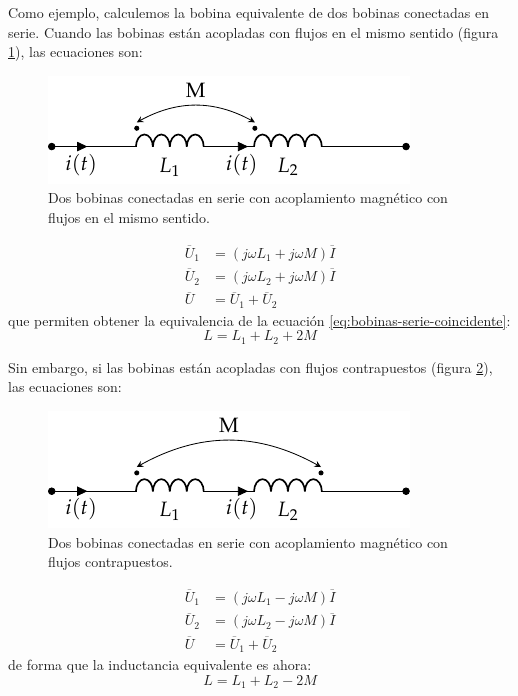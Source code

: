 Como ejemplo, calculemos la bobina equivalente de dos bobinas conectadas en serie. Cuando las bobinas están acopladas con flujos en el mismo sentido (figura \ref{fig:bobinas-serie-mismo-sentido}), las ecuaciones son:

\begin{figure}
  \centering
  \includegraphics[height=0.1\textheight]{../figs/bobinas_serie.pdf}
  \caption{Dos bobinas conectadas en serie con acoplamiento magnético con flujos en el mismo sentido.}
  \label{fig:bobinas-serie-mismo-sentido}
\end{figure}

  \begin{align*}
    \overline{U}_1 &= (j \omega L_1 + j \omega M) \overline{I}\\
    \overline{U}_2 &= (j \omega L_2 + j \omega M) \overline{I}\\
    \overline{U} &= \overline{U}_1 + \overline{U}_2 
  \end{align*}
que permiten obtener la equivalencia de la ecuación \ref{eq:bobinas-serie-coincidente}:
\begin{equation}
  \label{eq:bobinas-serie-mismo-sentido}
  L = L_1 + L_2 + 2M
\end{equation}

Sin embargo, si las bobinas están acopladas con flujos contrapuestos (figura \ref{fig:bobinas-serie-flujo-contrapuesto}), las ecuaciones son:
\begin{figure}
  \centering
  \includegraphics[height=0.1\textheight]{../figs/bobinas_serie_opuesto.pdf}
  \caption{Dos bobinas conectadas en serie con acoplamiento magnético  con flujos contrapuestos.}
  \label{fig:bobinas-serie-flujo-contrapuesto}
\end{figure}

\begin{align*}
  \overline{U}_1 &= (j \omega L_1 - j \omega M) \overline{I}\\
  \overline{U}_2 &= (j \omega L_2 - j \omega M) \overline{I}\\
  \overline{U} &= \overline{U}_1 + \overline{U}_2 
\end{align*}
de forma que la inductancia equivalente es ahora:
\begin{equation}
  \label{eq:bobinas-serie-contrapuesto}
  L = L_1 + L_2 - 2M
\end{equation}

